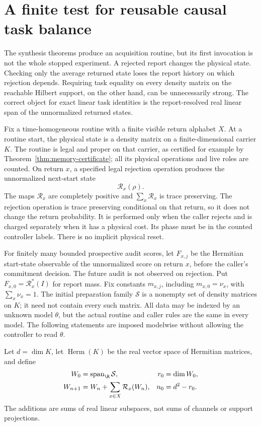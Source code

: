 \section{A finite test for reusable causal task balance}\label{sec:reusable}
The synthesis theorems produce an acquisition routine, but its first invocation is not the whole stopped experiment. A rejected report changes the physical state. Checking only the average returned state loses the report history on which rejection depends. Requiring task equality on every density matrix on the reachable Hilbert support, on the other hand, can be unnecessarily strong. The correct object for exact linear task identities is the report-resolved real linear span of the unnormalized returned states.

Fix a time-homogeneous routine with a finite visible return alphabet $X$. At a routine start, the physical state is a density matrix on a finite-dimensional carrier $K$. The routine is legal and proper on that carrier, as certified for example by Theorem~\ref{thm:memory-certificate}; all its physical operations and live roles are counted. On return $x$, a specified legal rejection operation produces the unnormalized next-start state
\[
 \mathcal R_x(\rho).
\]
The maps $\mathcal R_x$ are completely positive and $\sum_x\mathcal R_x$ is trace preserving. The rejection operation is trace preserving conditional on that return, so it does not change the return probability. It is performed only when the caller rejects and is charged separately when it has a physical cost. Its phase must be in the counted controller labels. There is no implicit physical reset.

For finitely many bounded prospective audit scores, let $F_{x,j}$ be the Hermitian start-state observable of the unnormalized score on return $x$, before the caller's commitment decision. The future audit is not observed on rejection. Put $F_{x,0}=\mathcal R_x^*(I)$ for report mass. Fix constants $m_{x,j}$, including $m_{x,0}=\nu_x$, with $\sum_x\nu_x=1$. The initial preparation family $\mathcal S$ is a nonempty set of density matrices on $K$; it need not contain every such matrix. All data may be indexed by an unknown model $\theta$, but the actual routine and caller rules are the same in every model. The following statements are imposed modelwise without allowing the controller to read $\theta$.

Let $d=\dim K$, let $\operatorname{Herm}(K)$ be the real vector space of Hermitian matrices, and define
\begin{align}
 W_0&=\operatorname{span}_{\R}\mathcal S, & r_0&=\dim W_0,\\
 W_{n+1}&=W_n+\sum_{x\in X}\mathcal R_x(W_n),& n_0&=d^2-r_0.\label{eq:return-span}
\end{align}
The additions are sums of real linear subspaces, not sums of channels or support projections.

